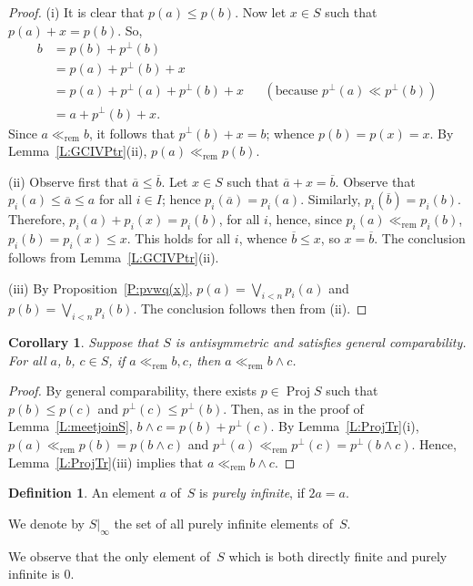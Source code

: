 \documentclass[psamsfonts,reqno]{memo-l}
\theoremstyle{plain}
\newtheorem{corollary}[lemma]{Corollary}
\theoremstyle{definition}
\newtheorem{definition}[lemma]{Definition}
\theoremstyle{remark}
\numberwithin{equation}{section}
\newcommand{\oll}[1]{\overline{#1}}
\newcommand{\rem}{\ll_{\mathrm{rem}}}
\newcommand{\DI}[1]{#1|_{\infty}}
\DeclareMathOperator{\BB}{Proj}
\begin{document}
\begin{proof}
(i) It is clear that $p(a)\leq p(b)$.
Now let $x\in S$ such that $p(a)+x=p(b)$. So,
   \begin{align*}
   b&=p(b)+p^\bot(b)\\
   &=p(a)+p^\bot(b)+x\\
   &=p(a)+p^\bot(a)+p^\bot(b)+x&&(\text{because }p^\bot(a)\ll p^\bot(b))\\
   &=a+p^\bot(b)+x.
   \end{align*}
Since $a\rem b$, it follows that $p^\bot(b)+x=b$; whence $p(b)=p(x)=x$.
By Lemma~\ref{L:GCIVPtr}(ii), $p(a)\rem p(b)$.

(ii) Observe first that $\oll{a}\leq\oll{b}$. Let $x\in S$ such that
$\oll{a}+x=\oll{b}$. Observe that $p_i(a)\leq\oll{a}\leq a$
for all $i\in I$; hence $p_i(\oll{a})=p_i(a)$. Similarly,
$p_i(\oll{b})=p_i(b)$. Therefore, $p_i(a)+p_i(x)=p_i(b)$, for all $i$,
hence, since $p_i(a)\rem p_i(b)$, $p_i(b)=p_i(x)\leq x$. This holds for all
$i$, whence $\oll{b}\leq x$, so $x=\oll{b}$.
The conclusion follows from Lemma~\ref{L:GCIVPtr}(ii).

(iii) By Proposition~\ref{P:pvwq(x)}, $p(a)=\bigvee_{i<n}p_i(a)$ and
$p(b)=\bigvee_{i<n}p_i(b)$. The conclusion follows then from (ii).
\end{proof}

\begin{corollary}\label{C:2-5.?}
Suppose that $S$ is antisymmetric and satisfies general comparability.
For all $a$, $b$, $c\in S$, if $a\rem b,c$, then $a\rem b\wedge c$.
\end{corollary}

\begin{proof}
By general comparability, there exists $p\in\BB{S}$\index{pzzroj@$\BB{S}$}
such that
$p(b)\leq p(c)$ and $p^\bot(c)\leq p^\bot(b)$. Then, as in the proof of
Lemma~\ref{L:meetjoinS}, $b\wedge c=p(b)+p^\bot(c)$. By
Lemma~\ref{L:ProjTr}(i), $p(a)\rem p(b)=p(b\wedge c)$ and
$p^\bot(a)\rem p^\bot(c)=p^\bot(b\wedge c)$. Hence,
Lemma~\ref{L:ProjTr}(iii) implies that $a\rem b\wedge c$.
\end{proof}

\begin{definition}\label{D:PurInf}
An element $a$ of~$S$ is \emph{purely infinite}, if $2a=a$.

We denote by $\DI{S}$\index{SzzDI@$\DI{S}$|ii}
the set of all purely infinite elements of~$S$.
\end{definition}

We observe that the only element of~$S$ which is both
 directly finite and purely infinite is $0$.
\end{document}
